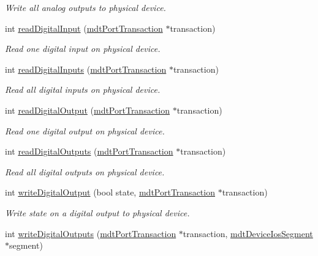 \begin{DoxyCompactItemize}
\begin{DoxyCompactList}\small\item\em Write all analog outputs to physical device. \end{DoxyCompactList}\item 
int \hyperlink{classmdt_device_modbus_a9dd05e51223ee5bb79970fbe84c501f9}{readDigitalInput} (\hyperlink{classmdt_port_transaction}{mdtPortTransaction} $\ast$transaction)
\begin{DoxyCompactList}\small\item\em Read one digital input on physical device. \end{DoxyCompactList}\item 
int \hyperlink{classmdt_device_modbus_a3fba9e113092f9da187cf684fb62b132}{readDigitalInputs} (\hyperlink{classmdt_port_transaction}{mdtPortTransaction} $\ast$transaction)
\begin{DoxyCompactList}\small\item\em Read all digital inputs on physical device. \end{DoxyCompactList}\item 
int \hyperlink{classmdt_device_modbus_a13a334ac86135751893f37064d8f548d}{readDigitalOutput} (\hyperlink{classmdt_port_transaction}{mdtPortTransaction} $\ast$transaction)
\begin{DoxyCompactList}\small\item\em Read one digital output on physical device. \end{DoxyCompactList}\item 
int \hyperlink{classmdt_device_modbus_a8915a036472bff0f356756992c1eae51}{readDigitalOutputs} (\hyperlink{classmdt_port_transaction}{mdtPortTransaction} $\ast$transaction)
\begin{DoxyCompactList}\small\item\em Read all digital outputs on physical device. \end{DoxyCompactList}\item 
int \hyperlink{classmdt_device_modbus_a6950c10fc521b193fb3c754223879694}{writeDigitalOutput} (bool state, \hyperlink{classmdt_port_transaction}{mdtPortTransaction} $\ast$transaction)
\begin{DoxyCompactList}\small\item\em Write state on a digital output to physical device. \end{DoxyCompactList}\item 
int \hyperlink{classmdt_device_modbus_a6713edaee0bfba48791008124299b753}{writeDigitalOutputs} (\hyperlink{classmdt_port_transaction}{mdtPortTransaction} $\ast$transaction, \hyperlink{classmdt_device_ios_segment}{mdtDeviceIosSegment} $\ast$segment)

\end{DoxyCompactItemize}
